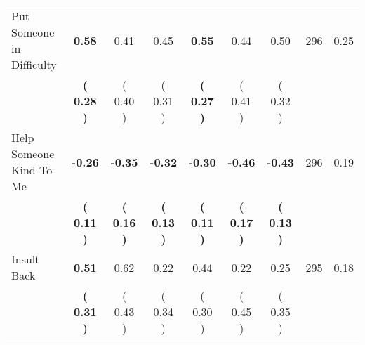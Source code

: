 \begin{tabular}{lcccccccc}
Put Someone in Difficulty & \textbf{     0.58} &      0.41 &      0.45 & \textbf{     0.55} &      0.44 &      0.50 & 296 &       0.25 \\ 
 & \textbf{(     0.28 )} & (     0.40 ) & (     0.31 ) & \textbf{(     0.27 )} & (     0.41 ) & (     0.32 ) & \\
Help Someone Kind To Me & \textbf{    -0.26} & \textbf{    -0.35} & \textbf{    -0.32} & \textbf{    -0.30} & \textbf{    -0.46} & \textbf{    -0.43} & 296 &       0.19 \\ 
 & \textbf{(     0.11 )} & \textbf{(     0.16 )} & \textbf{(     0.13 )} & \textbf{(     0.11 )} & \textbf{(     0.17 )} & \textbf{(     0.13 )} & \\
Insult Back & \textbf{     0.51} &      0.62 &      0.22 &      0.44 &      0.22 &      0.25 & 295 &       0.18 \\ 
 & \textbf{(     0.31 )} & (     0.43 ) & (     0.34 ) & (     0.30 ) & (     0.45 ) & (     0.35 ) & \\
\bottomrule
\end{tabular}
